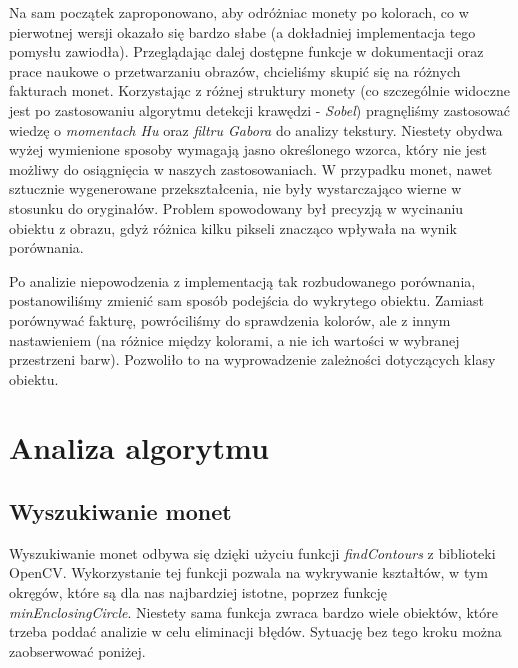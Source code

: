 \documentclass{mwart}
\begin{document}
Na sam początek zaproponowano, aby odróżniac monety po kolorach, co w pierwotnej wersji okazało się bardzo słabe (a dokładniej implementacja tego pomysłu zawiodła). Przeglądając dalej dostępne funkcje w dokumentacji oraz prace naukowe o przetwarzaniu obrazów, chcieliśmy skupić się na różnych fakturach monet. Korzystając z różnej struktury monety (co szczególnie widoczne jest po zastosowaniu algorytmu detekcji krawędzi - \textit{Sobel}) pragnęliśmy zastosować wiedzę o  \textit{momentach Hu} oraz \textit{filtru Gabora} do analizy tekstury.
Niestety obydwa wyżej wymienione sposoby wymagają jasno określonego wzorca, który nie jest możliwy do osiągnięcia w naszych zastosowaniach. W przypadku monet, nawet sztucznie wygenerowane przekształcenia, nie były wystarczająco wierne w stosunku do oryginałów. Problem spowodowany był precyzją w wycinaniu obiektu z obrazu, gdyż różnica kilku pikseli znacząco wpływała na wynik porównania.

Po analizie niepowodzenia z implementacją tak rozbudowanego porównania, postanowiliśmy zmienić sam sposób podejścia do wykrytego obiektu. Zamiast porównywać fakturę, powróciliśmy do sprawdzenia kolorów, ale z innym nastawieniem (na różnice między kolorami, a nie ich wartości w wybranej przestrzeni barw). Pozwoliło to na wyprowadzenie zależności dotyczących klasy obiektu.

\section{Analiza algorytmu}
\subsection{Wyszukiwanie monet}

Wyszukiwanie monet odbywa się dzięki użyciu funkcji \textit{findContours} z biblioteki OpenCV. Wykorzystanie tej funkcji pozwala na wykrywanie kształtów, w tym okręgów, które są dla nas najbardziej istotne, poprzez funkcję \textit{minEnclosingCircle}.
Niestety sama funkcja zwraca bardzo wiele obiektów, które trzeba poddać analizie w celu eliminacji błędów. Sytuację bez tego kroku można zaobserwować poniżej.
\end{document}
